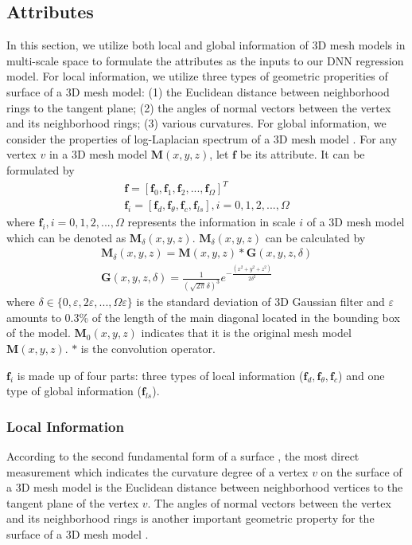 \documentclass[runningheads]{article}
\begin{document}
\subsection{Attributes}
In this section, we utilize both local and global information of 3D mesh models in multi-scale space to formulate the attributes as the inputs to our DNN regression model. For local information, we utilize three types of geometric properities of surface of a 3D mesh model: (1) the Euclidean distance between neighborhood rings to the tangent plane; (2) the angles of normal vectors between the vertex and its neighborhood rings; (3) various curvatures. For global information, we consider the properties of log-Laplacian spectrum of a 3D mesh model \cite{song2014mesh}. For any vertex \emph{$v$} in a 3D mesh model \emph{$\bm{M}(x,y,z)$}, let \emph{$\bm{f}$} be its attribute. It can be formulated by 
\begin{gather}
	\bm{f} = [\bm{f}_0,\bm{f}_1,\bm{f}_2,...,\bm{f}_\varOmega]^T\\
	\bm{f}_i = [\bm{f}_{d},\bm{f}_{\theta},\bm{f}_{c},\bm{f}_{ls}], i = 0,1,2,...,\varOmega
\end{gather}
where \emph{$\bm{f}_i,i=0,1,2,...,\varOmega$} represents the information in scale \emph{$i$} of a 3D mesh model which can be denoted as \emph{$\bm{M}_\delta(x,y,z)$}. \emph{$\bm{M}_\delta(x,y,z)$} can be calculated by
\begin{gather}
	\bm{M}_\delta(x,y,z)=\bm{M}(x,y,z)*\bm{G}(x,y,z,\delta)\\
	\bm{G}(x,y,z,\delta)=\frac{1}{(\sqrt{2\pi}\delta)^{3}}e^{-\frac{(x^{2}+y^{2}+z^{2})}{2\delta^2}}
\end{gather}
where \emph{$\delta \in \{0,\varepsilon,2\varepsilon,...,\varOmega\varepsilon\}$} is the standard deviation of 3D Gaussian filter and \emph{$\varepsilon$} amounts to 0.3\% of the length of the main diagonal located in the bounding box of the model. \emph{$\bm{M}_0(x,y,z)$} indicates that it is the original mesh model \emph{$\bm{M}(x,y,z)$}. \emph{$*$} is the convolution operator.

\emph{$\bm{f}_i$} is made up of  four parts: three types of local information (\emph{$\bm{f}_d,\bm{f}_\theta,\bm{f}_c$}) and one type of global information (\emph{$\bm{f}_{ls}$}).

\subsubsection{Local Information}
According to the second fundamental form of a surface \cite{harris1989second}, the most direct measurement which indicates the curvature degree of a vertex \emph{$v$} on the surface of a 3D mesh model is the Euclidean distance between neighborhood vertices to the tangent plane of the vertex \emph{$v$}. The angles of normal vectors between the vertex and its neighborhood rings is another important geometric property for the surface of a 3D mesh model \cite{don20143d}.
\end{document}
